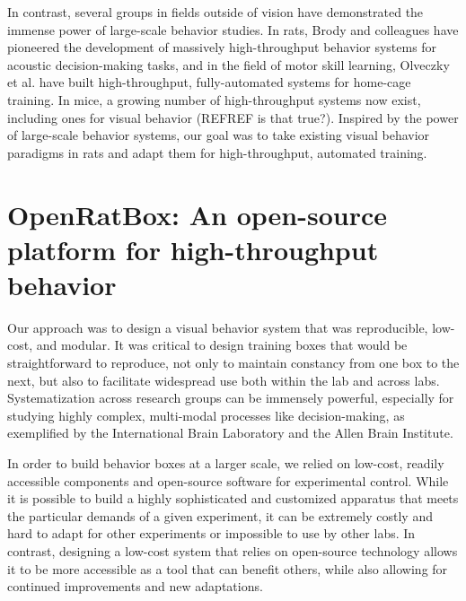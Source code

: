 In contrast, several groups in fields outside of vision have demonstrated the immense power of large-scale behavior studies. In rats, Brody and colleagues have pioneered the development of massively high-throughput behavior systems for acoustic decision-making tasks, and in the field of motor skill learning, Olveczky et al. have built high-throughput, fully-automated systems for home-cage training. In mice, a growing number of high-throughput systems now exist, including ones for visual behavior\cite{mouseacademy, etc} (REFREF is that true?). Inspired by the power of large-scale behavior systems, our goal was to take existing visual behavior paradigms in rats and adapt them for high-throughput, automated training. 



\section{OpenRatBox: An open-source platform for high-throughput behavior}
Our approach was to design a visual behavior system that was reproducible, low-cost, and modular. It was critical to design training boxes that would be straightforward to reproduce, not only to maintain constancy from one box to the next, but also to facilitate widespread use both within the lab and across labs. Systematization across research groups can be immensely powerful, especially for studying highly complex, multi-modal processes like decision-making, as exemplified by the International Brain Laboratory\cite{IBL} and the Allen Brain Institute\cite{REFREF}.

In order to build behavior boxes at a larger scale, we relied on low-cost, readily accessible components and open-source software for experimental control. While it is possible to build a highly sophisticated and customized apparatus that meets the particular demands of a given experiment, it can be extremely costly and hard to adapt for other experiments or impossible to use by other labs. In contrast, designing a low-cost system that relies on open-source technology allows it to be more accessible as a tool that can benefit others, while also allowing for continued improvements and new adaptations. 

